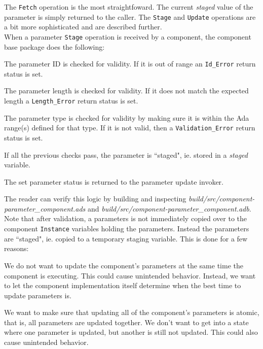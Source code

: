 The \texttt{Fetch} operation is the most straightfoward. The current \textit{staged} value of the parameter is simply returned to the caller. The \texttt{Stage} and \texttt{Update} operations are a bit more sophisticated and are described further. \\

When a parameter \texttt{Stage} operation is received by a component, the component base package does the following:

\vspace{5mm} %
\begin{spacedenumerate}
  \item The parameter ID is checked for validity. If it is out of range an \texttt{Id\_Error} return status is set.
  \item The parameter length is checked for validity. If it does not match the expected length a \texttt{Length\_Error} return status is set.
  \item The parameter type is checked for validity by making sure it is within the Ada range(s) defined for that type. If it is not valid, then a \texttt{Validation\_Error} return status is set.
  \item If all the previous checks pass, the parameter is ``staged", ie. stored in a \textit{staged} variable.
  \item The set parameter status is returned to the parameter update invoker.
\end{spacedenumerate}
\vspace{5mm} %

The reader can verify this logic by building and inspecting \textit{build/src/component-parameter\_component.ads} and \textit{build/src/component-parameter\_component.adb}. \\

Note that after validation, a parameters is not immediately copied over to the component \texttt{Instance} variables holding the parameters. Instead the parameters are ``staged", ie. copied to a temporary staging variable. This is done for a few reasons:

\vspace{5mm} %
\begin{spacedenumerate}
  \item We do not want to update the component's parameters at the same time the component is executing. This could cause unintended behavior. Instead, we want to let the component implementation itself determine when the best time to update parameters is.
  \item We want to make sure that updating all of the component's parameters is atomic, that is, all parameters are updated together. We don't want to get into a state where one parameter is updated, but another is still not updated. This could also cause unintended behavior.
\end{spacedenumerate}
\vspace{5mm} %

